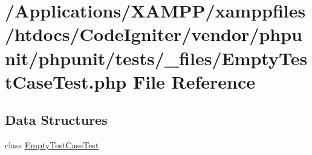\hypertarget{_empty_test_case_test_8php}{}\section{/\+Applications/\+X\+A\+M\+P\+P/xamppfiles/htdocs/\+Code\+Igniter/vendor/phpunit/phpunit/tests/\+\_\+files/\+Empty\+Test\+Case\+Test.php File Reference}
\label{_empty_test_case_test_8php}
\subsection*{Data Structures}
\begin{DoxyCompactItemize}
\item 
class \mbox{\hyperlink{class_empty_test_case_test}{Empty\+Test\+Case\+Test}}
\end{DoxyCompactItemize}
